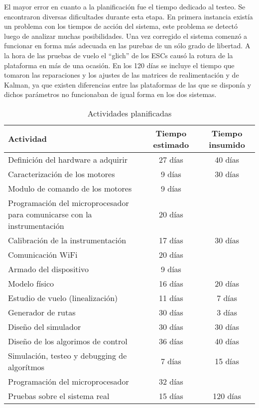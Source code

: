 \documentclass[main]{subfiles}
\begin{document}
El mayor error en cuanto a la planificaci\'on fue el tiempo dedicado al testeo. Se encontraron diversas dificultades durante esta etapa. En primera instancia exist\'ia un problema con los tiempos de acci\'on del sistema, este problema se detect\'o luego de analizar muchas posibilidades. Una vez corregido el sistema comenz\'o a funcionar en forma m\'as adecuada en las purebas de un s\'olo grado de libertad. A la hora de las pruebas de vuelo el ``glich'' de los ESCs caus\'o la rotura de la plataforma en m\'as de una ocasi\'on. En los 120 d\'ias se incluye el tiempo que tomaron las reparaciones y los ajustes de las matrices de realimentaci\'on y de Kalman, ya que existen diferencias entre las plataformas de las que se dispon\'ia y dichos par\'ametros no funcionaban de igual forma en los dos sistemas.\\ 

\begin{table}
\begin{tabular}{|p{150pt}|c|c|}
\hline
\cellcolor[gray]{0.8} Actividad & \cellcolor[gray]{0.8} Tiempo estimado & \cellcolor[gray]{0.8} Tiempo insumido\\
\hline
Definici\'on del hardware a adquirir & 27 d\'ias & 40 d\'ias\\
\hline
Caracterizaci\'on de los motores & 9 d\'ias & 30 d\'ias\\
\hline
Modulo de comando de los motores & 9 d\'ias &  \\
\hline
Programaci\'on del microprocesador para comunicarse con la instrumentaci\'on & 20 d\'ias & \\
\hline
Calibraci\'on de la instrumentaci\'on &17 d\'ias & 30 d\'ias \\
\hline
Comunicaci\'on WiFi &20 d\'ias & \\
\hline
Armado del dispositivo & 9 d\'ias & \\
\hline
Modelo f\'isico & 16 d\'ias & 20 d\'ias \\
\hline
Estudio de vuelo (linealizaci\'on) & 11 d\'ias & 7 d\'ias \\
\hline
Generador de rutas & 30 d\'ias& 3 d\'ias \\
\hline
Diseño del simulador &30 d\'ias & 30 d\'ias \\
\hline
Diseño de los algorimos de control & 36 d\'ias & 40 d\'ias \\
\hline
Simulaci\'on, testeo y debugging de algor\'itmos & 7 d\'ias & 15 d\'ias \\
\hline
Programaci\'on del microprocesador & 32 d\'ias & \\ 
\hline
Pruebas sobre el sistema real & 15 d\'ias & 120 d\'ias \\
\hline
\end{tabular}
\label{tab:wbs}
\caption{Actividades planificadas}
\end{table} 
\end{document}
